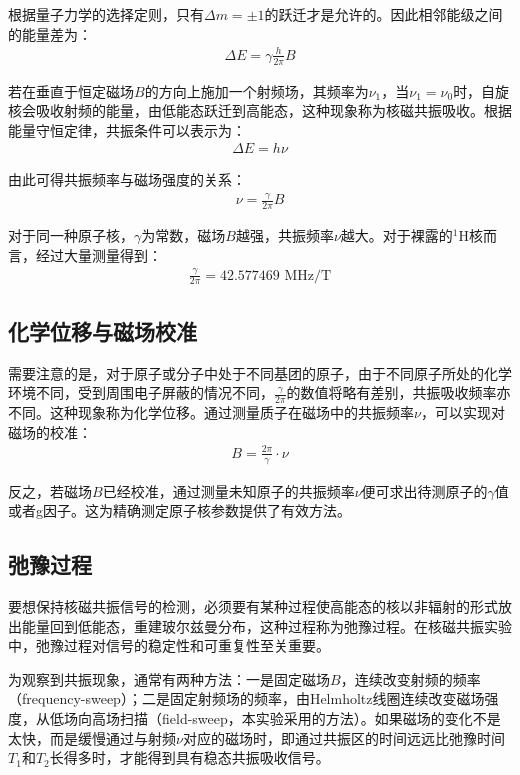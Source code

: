 ﻿\documentclass[12pt,a4paper]{article}
\begin{document}
根据量子力学的选择定则，只有$\Delta m = \pm1$的跃迁才是允许的。因此相邻能级之间的能量差为：
\begin{align}
\Delta E = \gamma \frac{h}{2\pi} B
\end{align}

若在垂直于恒定磁场$B$的方向上施加一个射频场，其频率为$\nu_1$，当$\nu_1=\nu_0$时，自旋核会吸收射频的能量，由低能态跃迁到高能态，这种现象称为核磁共振吸收。根据能量守恒定律，共振条件可以表示为：
\begin{align}
\Delta E = h \nu
\end{align}

由此可得共振频率与磁场强度的关系：
\begin{align}
\nu = \frac{\gamma}{2\pi} B
\end{align}

对于同一种原子核，$\gamma$为常数，磁场$B$越强，共振频率$\nu$越大。对于裸露的$^1$H核而言，经过大量测量得到：
\begin{align}
\frac{\gamma}{2\pi} = 42.577469 \text{ MHz/T}
\end{align}

\subsection{化学位移与磁场校准}

需要注意的是，对于原子或分子中处于不同基团的原子，由于不同原子所处的化学环境不同，受到周围电子屏蔽的情况不同，$\frac{\gamma}{2\pi}$的数值将略有差别，共振吸收频率亦不同。这种现象称为化学位移。通过测量质子在磁场中的共振频率$\nu$，可以实现对磁场的校准：
\begin{align}
B = \frac{2\pi}{\gamma}\cdot \nu
\end{align}

反之，若磁场$B$已经校准，通过测量未知原子的共振频率$\nu$便可求出待测原子的$\gamma$值或者g因子。这为精确测定原子核参数提供了有效方法。

\subsection{弛豫过程}

要想保持核磁共振信号的检测，必须要有某种过程使高能态的核以非辐射的形式放出能量回到低能态，重建玻尔兹曼分布，这种过程称为弛豫过程。在核磁共振实验中，弛豫过程对信号的稳定性和可重复性至关重要。

为观察到共振现象，通常有两种方法：一是固定磁场$B$，连续改变射频的频率（frequency-sweep）；二是固定射频场的频率，由Helmholtz线圈连续改变磁场强度，从低场向高场扫描（field-sweep，本实验采用的方法）。如果磁场的变化不是太快，而是缓慢通过与射频$\nu$对应的磁场时，即通过共振区的时间远远比弛豫时间$T_1$和$T_2$长得多时，才能得到具有稳态共振吸收信号。
\end{document}
